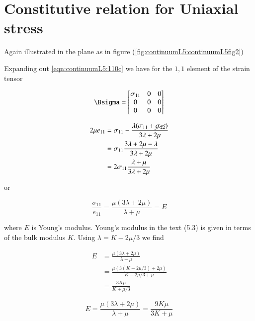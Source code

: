 \section{Constitutive relation for Uniaxial stress}

Again illustrated in the plane as in figure (\ref{fig:continuumL5:continuumL5fig2})

Expanding out \ref{eqn:continuumL5:110c} we have for the $1,1$ element of the strain tensor


\begin{equation}\label{eqn:continuumL5:290}
\Bsigma =
\begin{bmatrix}
\sigma_{11} & 0 & 0\\
0 & 0 & 0 \\
0 & 0 & 0
\end{bmatrix}
\end{equation}

\begin{align*}
2 \mu e_{11}
&= \sigma_{11} - \frac{\lambda ( \sigma_{11} + \cancel{\sigma_{22}} ) }{3 \lambda + 2 \mu} \\
&= \sigma_{11} \frac{3 \lambda + 2 \mu - \lambda }{3 \lambda + 2 \mu} \\
&= 2 \sigma_{11} \frac{\lambda + \mu }{3 \lambda + 2 \mu}
\end{align*}

or

\begin{equation}\label{eqn:continuumL5:310}
\frac{\sigma_{11}}{e_{11}} = \frac{\mu(3 \lambda + 2 \mu)}{\lambda + \mu } = E
\end{equation}

where $E$ is Young's modulus.  Young's modulus in the text (5.3) is given in terms of the bulk modulus $K$.  Using $\lambda = K - 2\mu/3$ we find

\begin{align*}
E 
&=
\frac{\mu(3 \lambda + 2 \mu)}{\lambda + \mu } \\
&=
\frac{\mu(3 (K - 2\mu/3)+ 2 \mu)}{K - 2\mu/3 + \mu } \\
&=
\frac{3 K \mu}{ K + \mu/3 } 
\end{align*}

\begin{equation}\label{eqn:continuumL5:330}
\boxed{
E =
\frac{\mu(3 \lambda + 2 \mu)}{\lambda + \mu } =
\frac{9 K \mu}{ 3 K + \mu } 
}
\end{equation}

